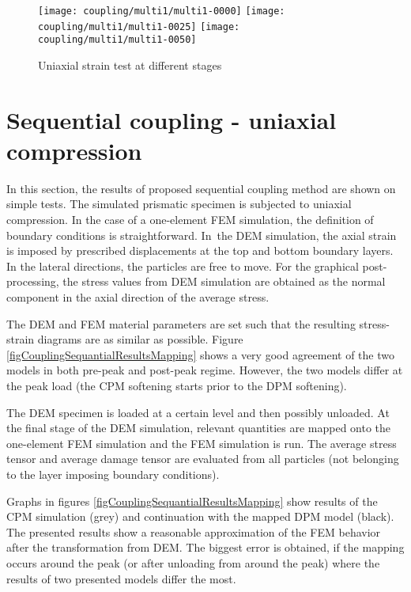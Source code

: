 \begin{figure}[p]
	\centering
	\texttt{[image: coupling/multi1/multi1-0000]}
	\texttt{[image: coupling/multi1/multi1-0025]}
	\texttt{[image: coupling/multi1/multi1-0050]}
	\caption{Uniaxial strain test at different stages}
	\label{figCouplingConcurrentMultiExample1}
\end{figure}



\section{Sequential coupling - uniaxial compression}\label{secCouplingSequentialExamples}
In this section, the results of proposed sequential coupling method are shown on simple  tests.
The simulated prismatic specimen is subjected to uniaxial compression.
In the case of a one-element FEM simulation, the definition of boundary conditions is straightforward.
In~the DEM simulation, the axial strain is imposed by prescribed displacements at the top and bottom boundary layers.
In the lateral directions, the particles are free to move.
For the graphical post-processing, the stress values from DEM simulation are obtained as the normal component in the axial direction of the average stress.

The DEM and FEM material parameters are set such that the resulting stress-strain diagrams are as similar as possible.
Figure \ref{figCouplingSequantialResultsMapping} shows a very good agreement of the two models in both pre-peak and post-peak regime.
However, the two models differ at the peak load (the CPM softening starts prior to the DPM softening).

The DEM specimen is loaded at a certain level and then possibly unloaded.
At the final stage of the DEM simulation, relevant quantities are mapped onto the one-element FEM simulation and the FEM simulation is run.
The average stress tensor and average damage tensor are evaluated from all  particles (not belonging to the layer imposing boundary conditions).

Graphs in figures \ref{figCouplingSequantialResultsMapping} show results of the CPM simulation (grey) and continuation with the mapped DPM model (black).
The presented results show a reasonable approximation of the FEM behavior after the transformation from DEM.
The biggest error is obtained, if the mapping occurs around the peak (or after unloading from around the peak) where the results of two presented models differ the most.

